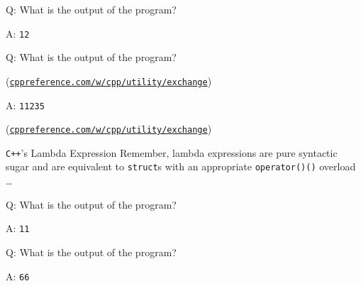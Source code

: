 \begin{frame}[fragile]{Q: What is the output of the program?}
\end{frame}

\begin{frame}[fragile]{A: \texttt{12}}
\end{frame}

\begin{frame}[fragile]{Q: What is the output of the program?}

    \begin{center}
        (\href{https://en.cppreference.com/w/cpp/utility/exchange}{\texttt{cppreference.com/w/cpp/utility/exchange}})
    \end{center}
\end{frame}

\begin{frame}[fragile]{A: \texttt{11235}}

    \begin{center}
        (\href{https://en.cppreference.com/w/cpp/utility/exchange}{\texttt{cppreference.com/w/cpp/utility/exchange}})
    \end{center}
\end{frame}

\begin{frame}{\texttt{C++}'s Lambda Expression}
    Remember, lambda expressions are pure syntactic sugar and are equivalent to \texttt{struct}s with an appropriate \texttt{operator()()} overload \ldots
\end{frame}

\begin{frame}[fragile]{Q: What is the output of the program?}
\end{frame}

\begin{frame}[fragile]{A: \texttt{11}}
\end{frame}

\begin{frame}[fragile]{Q: What is the output of the program?}
\end{frame}

\begin{frame}[fragile]{A: \texttt{66}}
\end{frame}

